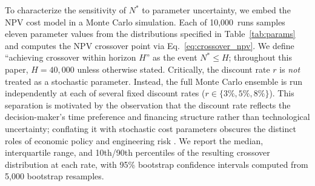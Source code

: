 \documentclass[preprint,12pt]{elsarticle}
\begin{document}
To characterize the sensitivity of $N^*$ to parameter uncertainty, we embed the NPV cost model in a Monte Carlo simulation. Each of 10{,}000~runs samples eleven parameter values from the distributions specified in Table~\ref{tab:params} and computes the NPV crossover point via Eq.~\ref{eq:crossover_npv}. We define ``achieving crossover within horizon $H$'' as the event $N^* \leq H$; throughout this paper, $H = 40{,}000$ unless otherwise stated. Critically, the discount rate $r$ is \emph{not} treated as a stochastic parameter. Instead, the full Monte Carlo ensemble is run independently at each of several fixed discount rates ($r \in \{3\%, 5\%, 8\%\}$). This separation is motivated by the observation that the discount rate reflects the decision-maker's time preference and financing structure rather than technological uncertainty; conflating it with stochastic cost parameters obscures the distinct roles of economic policy and engineering risk \cite{arrow2014}. We report the median, interquartile range, and 10th/90th percentiles of the resulting crossover distribution at each rate, with 95\% bootstrap confidence intervals computed from 5{,}000 bootstrap resamples.
\end{document}
